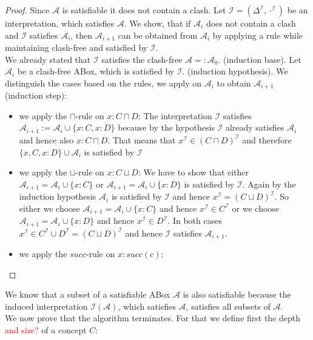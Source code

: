 \documentclass[a4paper,11pt]{scrartcl}
\theoremstyle{break}
\theoremstyle{definition}
\begin{document}
\begin{proof}
Since $\mathcal{A}$ is satisfiable it does not contain a clash. Let $\mathcal{I}=(\Delta^\mathcal{I},\cdot^\mathcal{I})$ be an interpretation, which satisfies $\mathcal{A}$. We show, that if $\mathcal{A}_i$ does not contain a clash and $\mathcal{I}$ satisfies $\mathcal{A}_i$, then $\mathcal{A}_{i+1}$ can be obtained from $\mathcal{A}_i$ by applying a rule while maintaining clash-free and satisfied by $\mathcal{I}$.\\
We already stated that $\mathcal{I}$ satisfies the clash-free $\mathcal{A}=:\mathcal{A}_{0}$. (induction base).
Let $\mathcal{A}_i$ be a clash-free ABox, which is satisfied by $\mathcal{I}$. (induction hypothesis).
We distinguish the cases based on the rules, we apply on $\mathcal{A}_i$ to obtain $\mathcal{A}_{i+1}$ (induction step):
\begin{itemize}
\item we apply the $\sqcap$-rule on $x:C\sqcap D$: The interpretation $\mathcal{I}$ satisfies $\mathcal{A}_{i+1}:=\mathcal{A}_i\cup\{x:C,x:D\}$ because by the hypothesis $\mathcal{I}$ already satisfies $\mathcal{A}_i$ and hence also $x:C\sqcap D$. That means that $x^\mathcal{I}\in(C\sqcap D)^\mathcal{I}$ and therefore $\{x,C,x:D\}\cup\mathcal{A}_i$ is satisfied by $\mathcal{I}$
\item we apply the $\sqcup$-rule on $x:C\sqcup D$: We have to show that either $\mathcal{A}_{i+1}=\mathcal{A}_i\cup\{x:C\}$ or $\mathcal{A}_{i+1}=\mathcal{A}_i\cup\{x:D\}$ is satisfied by $\mathcal{I}$. Again by the induction hypothesis $\mathcal{A}_i$ is satisfied by $\mathcal{I}$ and hence $x^\mathcal{I}=(C\sqcup D)^\mathcal{I}$. So either we choose $\mathcal{A}_{i+1}=\mathcal{A}_i\cup\{x:C\}$ and hence $x^\mathcal{I}\in C^\mathcal{I}$ or we choose $\mathcal{A}_{i+1}=\mathcal{A}_i\cup\{x:D\}$ and hence $x^\mathcal{I}\in D^\mathcal{I}$. In both cases $x^\mathcal{I}\in C^\mathcal{I}\cup D^\mathcal{I}=(C\sqcup D)^\mathcal{I}$ and hence $\mathcal{I}$ satisfies $\mathcal{A}_{i+1}$.
\item we apply the $succ$-rule on $x:succ(c)$: 
\end{itemize}
\end{proof}
We know that a subset of a satisfiable ABox $\mathcal{A}$ is also satisfiable because the induced interpretation $\mathcal{I}(\mathcal{A})$, which satisfies $\mathcal{A}$, satisfies all subsets of $\mathcal{A}$.\\
We now prove that the algorithm terminates. For that we define first the depth \textcolor{red}{and size?} of a concept $C$:
\end{document}
